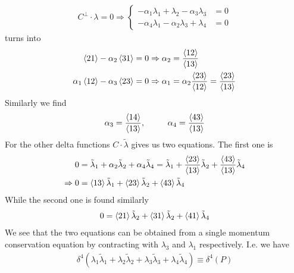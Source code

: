 \documentclass[letter,11pt]{article}
\begin{document}
\begin{equation}
	\begin{aligned}
		C^\perp\cdot \lambda=0\Rightarrow\begin{cases}
			-\alpha_1\lambda_1+\lambda_2-\alpha_3\lambda_3&=0\\
			-\alpha_4\lambda_1-\alpha_2\lambda_3+\lambda_4&=0
		\end{cases}
	\end{aligned}
\end{equation}
turns into
\begin{equation}
	\begin{aligned}
		\expval{21} -\alpha_2 \expval{31}&=0\Rightarrow\alpha_2=\frac{\expval{12}}{\expval{13}}\\
		\alpha_1\expval{12} -\alpha_3\expval{23}&=0 \Rightarrow\alpha_1=\alpha_2\frac{\expval{23}}{\expval{12}}=\frac{\expval{23}}{\expval{13}}
	\end{aligned}
\end{equation}
Similarly we find
\begin{equation}
	\begin{aligned}
		\alpha_3=\frac{\expval{14}}{\expval{13}},~~~~~~~~\alpha_4=\frac{\expval{43}}{\expval{13}}
	\end{aligned}
\end{equation}
For the other delta functions $C\cdot \tilde\lambda$ gives us two equations. The first one is
\begin{equation}
	\begin{aligned}
		0&=\tilde\lambda_1+\alpha_2\tilde\lambda_2+\alpha_4\tilde\lambda_4=\tilde\lambda_1+\frac{\expval{23}}{\expval{13}}\tilde\lambda_2+\frac{\expval{43}}{\expval{13}}\tilde\lambda_4\\
		\Rightarrow 0&=\expval{13}\tilde\lambda_1+\expval{23}\tilde\lambda_2+\expval{43}\tilde\lambda_4
	\end{aligned}
\end{equation}
While the second one is found similarly
\begin{equation}
	\begin{aligned}
		0=\expval{21}\tilde\lambda_2+\expval{31}\tilde\lambda_2+\expval{41}\tilde\lambda_4
	\end{aligned}
\end{equation}
We see that the two equations can be obtained from a single momentum conservation equation by contracting with $\lambda_3$ and $\lambda_1$ respectively. I.e. we have
\begin{equation}
	\begin{aligned}
		\delta^{4}(\lambda_1\tilde\lambda_1+\lambda_2\tilde\lambda_2+\lambda_3\tilde\lambda_3+\lambda_4\tilde\lambda_4)\equiv \delta^{4}\left(P\right)
	\end{aligned}
\end{equation}
\end{document}
